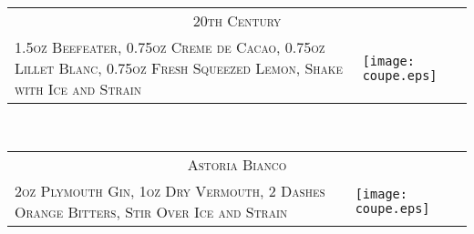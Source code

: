 \documentclass{article}
\begin{document}
\begin{tabular}{b{2.5in} m{0.625in}}
  \multicolumn{2}{c}{\Huge\textsc{20th Century}}\\ 
  \textsc{1.5oz Beefeater, 0.75oz Creme de
    Cacao, 0.75oz Lillet Blanc, 0.75oz Fresh Squeezed Lemon, Shake
    with Ice and Strain} &
  \texttt{[image: coupe.eps]}
\end{tabular}\\

\begin{tabular}{b{2.5in} m{0.625in}}
  \multicolumn{2}{c}{\Huge\textsc{Astoria Bianco}} \\ 
  \textsc{2oz Plymouth Gin, 1oz Dry Vermouth, 2
  Dashes Orange Bitters, Stir Over Ice and Strain} &
  \texttt{[image: coupe.eps]}
\end{tabular}
\end{document}
